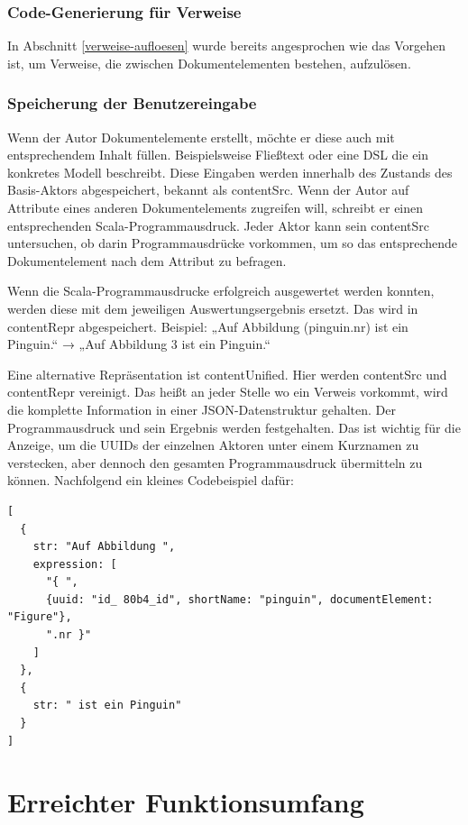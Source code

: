  
\subsubsection{Code-Generierung für Verweise}\label{}

 
In Abschnitt \ref{verweise-aufloesen} wurde bereits angesprochen wie das Vorgehen ist, um Verweise, die zwischen Dokumentelementen bestehen, aufzulösen.

 
\subsubsection{Speicherung der Benutzereingabe}\label{contentSrc}

 
Wenn der Autor Dokumentelemente erstellt, möchte er diese auch mit entsprechendem Inhalt füllen. Beispielsweise Fließtext oder eine DSL die ein konkretes Modell beschreibt. Diese Eingaben werden innerhalb des Zustands des Basis-Aktors abgespeichert, bekannt als contentSrc. Wenn der Autor auf Attribute eines anderen Dokumentelements zugreifen will, schreibt er einen entsprechenden Scala-Programmausdruck. Jeder Aktor kann sein contentSrc untersuchen, ob darin Programmausdrücke vorkommen, um so das entsprechende Dokumentelement nach dem Attribut zu befragen.

 
Wenn die Scala-Programmausdrucke erfolgreich ausgewertet werden konnten, werden diese mit dem jeweiligen Auswertungsergebnis ersetzt. Das wird in contentRepr abgespeichert. Beispiel: „Auf Abbildung (pinguin.nr) ist ein Pinguin.“ → „Auf Abbildung 3 ist ein Pinguin.“

 
Eine alternative Repräsentation ist contentUnified. Hier werden contentSrc und contentRepr vereinigt. Das heißt an jeder Stelle wo ein Verweis vorkommt, wird die komplette Information in einer JSON-Datenstruktur gehalten. Der Programmausdruck und sein Ergebnis werden festgehalten. Das ist wichtig für die Anzeige, um die UUIDs der einzelnen Aktoren unter einem Kurznamen zu verstecken, aber dennoch den gesamten Programmausdruck übermitteln zu können. Nachfolgend ein kleines Codebeispiel dafür:

 
\begin{verbatim}
[
  {
    str: "Auf Abbildung ",
    expression: [
      "{ ",
      {uuid: "id_ 80b4_id", shortName: "pinguin", documentElement: "Figure"},
      ".nr }"
    ]
  },
  {
    str: " ist ein Pinguin"
  }
]
\end{verbatim}
 
\section{Erreichter Funktionsumfang}\label{}
 
